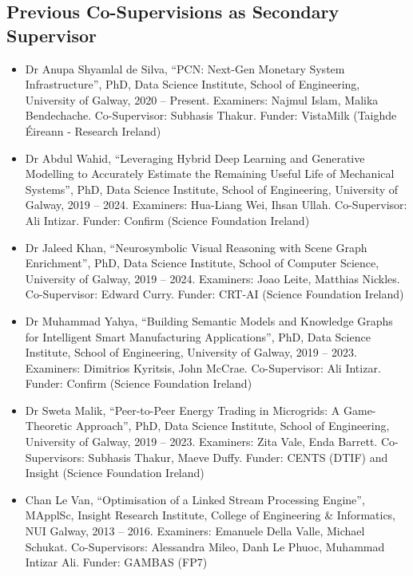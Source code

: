 \documentclass[10pt,a4paper]{res} %
\begin{document}
\begin{resume}
\subsection*{Previous Co-Supervisions as Secondary Supervisor}

\begin{itemize} \itemsep -2pt
\item Dr Anupa Shyamlal de Silva, ``PCN: Next-Gen Monetary System Infrastructure'', PhD, Data Science Institute, School of Engineering, University of Galway, 2020 -- Present. Examiners: Najmul Islam, Malika Bendechache. Co-Supervisor: Subhasis Thakur. Funder: VistaMilk (Taighde \'{E}ireann - Research Ireland) %
\item Dr Abdul Wahid, ``Leveraging Hybrid Deep Learning and Generative Modelling to Accurately Estimate the Remaining Useful Life of Mechanical Systems'', PhD, Data Science Institute, School of Engineering, University of Galway, 2019 -- 2024. Examiners: Hua-Liang Wei, Ihsan Ullah. Co-Supervisor: Ali Intizar. Funder: Confirm (Science Foundation Ireland) %
\item Dr Jaleed Khan, ``Neurosymbolic Visual Reasoning with Scene Graph Enrichment'', PhD, Data Science Institute, School of Computer Science, University of Galway, 2019 -- 2024. Examiners: Joao Leite, Matthias Nickles. Co-Supervisor: Edward Curry. Funder: CRT-AI (Science Foundation Ireland) %
\item Dr Muhammad Yahya, ``Building Semantic Models and Knowledge Graphs for Intelligent Smart Manufacturing Applications'', PhD, Data Science Institute, School of Engineering, University of Galway, 2019 -- 2023. Examiners: Dimitrios Kyritsis, John McCrae. Co-Supervisor: Ali Intizar. Funder: Confirm (Science Foundation Ireland) %
\item Dr Sweta Malik, ``Peer-to-Peer Energy Trading in Microgrids: A Game-Theoretic Approach'', PhD, Data Science Institute, School of Engineering, University of Galway, 2019 -- 2023. Examiners: Zita Vale, Enda Barrett. Co-Supervisors: Subhasis Thakur, Maeve Duffy. Funder: CENTS (DTIF) and Insight (Science Foundation Ireland) %
\item Chan Le Van, ``Optimisation of a Linked Stream Processing Engine'', MApplSc, Insight Research Institute, College of Engineering \& Informatics, NUI Galway, 2013 -- 2016. Examiners: Emanuele Della Valle, Michael Schukat. Co-Supervisors: Alessandra Mileo, Danh Le Phuoc, Muhammad Intizar Ali. Funder: GAMBAS (FP7)

\end{itemize}
\end{resume}
\end{document}
